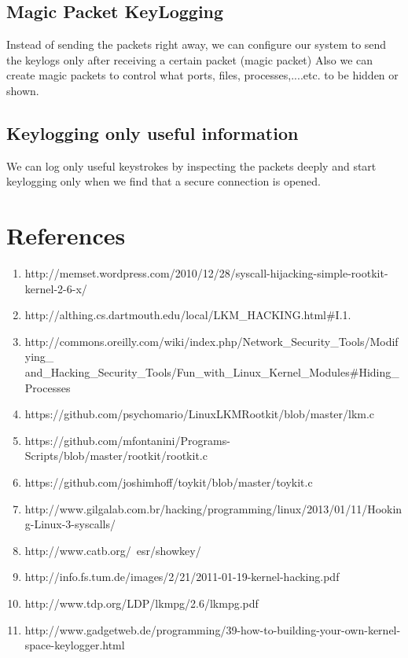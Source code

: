 \documentclass{article}
\begin{document}
\subsection{Magic Packet KeyLogging}
Instead of sending the packets right away, we can configure our system to send the keylogs only after receiving a certain packet (magic packet)
Also we can create magic packets to control what ports, files, processes,....etc. to be hidden or shown.
\subsection{Keylogging only useful information}
We can log only  useful keystrokes by inspecting the packets deeply and start keylogging only when we find that a secure connection is opened.
\clearpage
\section{References}
\begin{enumerate}
\item http://memset.wordpress.com/2010/12/28/syscall-hijacking-simple-rootkit-kernel-2-6-x/
\item http://althing.cs.dartmouth.edu/local/LKM\_HACKING.html\#I.1.
\item http://commons.oreilly.com/wiki/index.php/Network\_Security\_Tools/Modifying\_\\and\_Hacking\_Security\_Tools/Fun\_with\_Linux\_Kernel\_Modules\#Hiding\_Processes
\item https://github.com/psychomario/LinuxLKMRootkit/blob/master/lkm.c
\item https://github.com/mfontanini/Programs-Scripts/blob/master/rootkit/rootkit.c
\item https://github.com/joshimhoff/toykit/blob/master/toykit.c
\item http://www.gilgalab.com.br/hacking/programming/linux/2013/01/11/Hooking-Linux-3-syscalls/
\item http://www.catb.org/~esr/showkey/
\item http://info.fs.tum.de/images/2/21/2011-01-19-kernel-hacking.pdf
\item http://www.tdp.org/LDP/lkmpg/2.6/lkmpg.pdf
\item http://www.gadgetweb.de/programming/39-how-to-building-your-own-kernel-space-keylogger.html
\end{enumerate}
\end{document}
